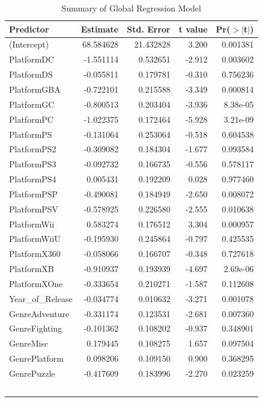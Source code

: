 \documentclass[12pt]{article}
\begin{document}
\begin{table}[ht]
  \caption{Summary of Global Regression Model}
  \label{tab:global}
\centering
\begin{tabular}{lrrrr}
\hline
Predictor & Estimate & Std. Error & t value & Pr($>$$|$t$|$) \\ 
\hline
(Intercept) & 68.584628  & 21.432828  & 3.200 & 0.001381 \\
PlatformDC & -1.551114  & 0.532651  & -2.912 & 0.003602 \\
PlatformDS & -0.055811  & 0.179781  & -0.310 & 0.756236 \\
PlatformGBA & -0.722101  & 0.215588  & -3.349 & 0.000814 \\
PlatformGC & -0.800513  & 0.203404  & -3.936 & 8.38e-05 \\
PlatformPC & -1.022375  & 0.172464  & -5.928 & 3.21e-09 \\
PlatformPS & -0.131064  & 0.253064  & -0.518 & 0.604538 \\
PlatformPS2 & -0.309082  & 0.184304  & -1.677 & 0.093584 \\
PlatformPS3 & -0.092732  & 0.166735  & -0.556 & 0.578117 \\
PlatformPS4 & 0.005431  & 0.192209  & 0.028 & 0.977460 \\
PlatformPSP & -0.490081  & 0.184949  & -2.650 & 0.008072 \\
PlatformPSV & -0.578925  & 0.226580  & -2.555 & 0.010638 \\
PlatformWii & 0.583274  & 0.176512  & 3.304 & 0.000957 \\
PlatformWiiU & -0.195930  & 0.245864  & -0.797 & 0.425535 \\
PlatformX360 & -0.058066  & 0.166707  & -0.348 & 0.727618 \\
PlatformXB & -0.910937  & 0.193939  & -4.697 & 2.69e-06 \\
PlatformXOne & -0.333654  & 0.210271  & -1.587 & 0.112608 \\
Year_of_Release & -0.034774  & 0.010632  & -3.271 & 0.001078 \\
GenreAdventure & -0.331174  & 0.123531  & -2.681 & 0.007360 \\
GenreFighting & -0.101362  & 0.108202  & -0.937 & 0.348901 \\
GenreMisc & 0.179445  & 0.108275  & 1.657 & 0.097504 \\
GenrePlatform & 0.098206  & 0.109150  & 0.900 & 0.368295 \\
GenrePuzzle & -0.417609  & 0.183996  & -2.270 & 0.023259 \\
$$
\end{tabular}
\end{table}
\end{document}

